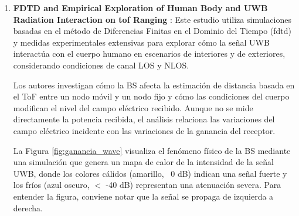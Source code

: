 \begin{enumerate}
    \item \textbf{FDTD and Empirical Exploration of Human Body and UWB Radiation Interaction on \gls{tof} Ranging} \cite{Otim2019}: Este estudio utiliza simulaciones basadas en el método de Diferencias Finitas en el Dominio del Tiempo (\gls{fdtd}) y medidas experimentales extensivas para explorar cómo la señal UWB interactúa con el cuerpo humano en escenarios de interiores y de exteriores, considerando condiciones de canal LOS y NLOS.
    
    Los autores investigan cómo la BS afecta la estimación de distancia basada en el ToF entre un nodo móvil y un nodo fijo y cómo las condiciones del cuerpo modifican el nivel del campo eléctrico recibido. Aunque no se mide directamente la potencia recibida, el análisis relaciona las variaciones del campo eléctrico incidente con las variaciones de la ganancia del receptor.

    La Figura \ref{fig:ganancia_wave} visualiza el fenómeno físico de la BS mediante una simulación que genera un mapa de calor de la intensidad de la señal UWB, donde los colores cálidos (amarillo, ~0 dB) indican una señal fuerte y los fríos (azul oscuro, $<$ -40 dB) representan una atenuación severa. Para entender la figura, conviene notar que la señal se propaga de izquierda a derecha.
    

\end{enumerate}
